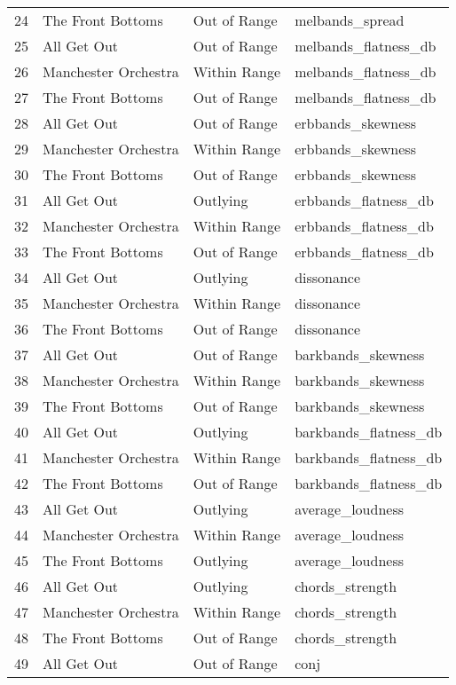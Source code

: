 \documentclass{article}\usepackage[]{graphicx}\usepackage[]{xcolor}
\begin{document}
\begin{table}[ht]
\begin{tabular}{rlll}
  24 & The Front Bottoms & Out of Range & melbands\_spread \\ 
  25 & All Get Out & Out of Range & melbands\_flatness\_db \\ 
  26 & Manchester Orchestra & Within Range & melbands\_flatness\_db \\ 
  27 & The Front Bottoms & Out of Range & melbands\_flatness\_db \\ 
  28 & All Get Out & Out of Range & erbbands\_skewness \\ 
  29 & Manchester Orchestra & Within Range & erbbands\_skewness \\ 
  30 & The Front Bottoms & Out of Range & erbbands\_skewness \\ 
  31 & All Get Out & Outlying & erbbands\_flatness\_db \\ 
  32 & Manchester Orchestra & Within Range & erbbands\_flatness\_db \\ 
  33 & The Front Bottoms & Out of Range & erbbands\_flatness\_db \\ 
  34 & All Get Out & Outlying & dissonance \\ 
  35 & Manchester Orchestra & Within Range & dissonance \\ 
  36 & The Front Bottoms & Out of Range & dissonance \\ 
  37 & All Get Out & Out of Range & barkbands\_skewness \\ 
  38 & Manchester Orchestra & Within Range & barkbands\_skewness \\ 
  39 & The Front Bottoms & Out of Range & barkbands\_skewness \\ 
  40 & All Get Out & Outlying & barkbands\_flatness\_db \\ 
  41 & Manchester Orchestra & Within Range & barkbands\_flatness\_db \\ 
  42 & The Front Bottoms & Out of Range & barkbands\_flatness\_db \\ 
  43 & All Get Out & Outlying & average\_loudness \\ 
  44 & Manchester Orchestra & Within Range & average\_loudness \\ 
  45 & The Front Bottoms & Outlying & average\_loudness \\ 
  46 & All Get Out & Outlying & chords\_strength \\ 
  47 & Manchester Orchestra & Within Range & chords\_strength \\ 
  48 & The Front Bottoms & Out of Range & chords\_strength \\ 
  49 & All Get Out & Out of Range & conj \\ 

\end{tabular}
\end{table}
\end{document}
